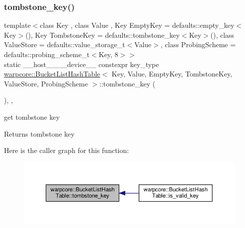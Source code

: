 \subsubsection{\texorpdfstring{tombstone\+\_\+key()}{tombstone\_key()}}
{\footnotesize\ttfamily template$<$class Key , class Value , Key Empty\+Key = defaults\+::empty\+\_\+key$<$\+Key$>$(), Key Tombstone\+Key = defaults\+::tombstone\+\_\+key$<$\+Key$>$(), class Value\+Store  = defaults\+::value\+\_\+storage\+\_\+t$<$\+Value$>$, class Probing\+Scheme  = defaults\+::probing\+\_\+scheme\+\_\+t$<$\+Key, 8$>$$>$ \\
static \+\_\+\+\_\+host\+\_\+\+\_\+\+\_\+\+\_\+device\+\_\+\+\_\+ constexpr key\+\_\+type \hyperlink{classwarpcore_1_1BucketListHashTable}{warpcore\+::\+Bucket\+List\+Hash\+Table}$<$ Key, Value, Empty\+Key, Tombstone\+Key, Value\+Store, Probing\+Scheme $>$\+::tombstone\+\_\+key (\begin{DoxyParamCaption}{ }\end{DoxyParamCaption})\hspace{0.3cm}{\ttfamily [inline]}, {\ttfamily [static]}, {\ttfamily [noexcept]}}



get tombstone key 

\begin{DoxyReturn}{Returns}
tombstone key 
\end{DoxyReturn}
Here is the caller graph for this function\+:
\nopagebreak
\begin{figure}[H]
\begin{center}
\leavevmode
\includegraphics[width=350pt]{classwarpcore_1_1BucketListHashTable_a985f5a5fc540a0a157a7508f8b326a50_icgraph}
\end{center}
\end{figure}
\mbox{\label{classwarpcore_1_1BucketListHashTable_a7777451fb2e8d4016f5baf2a0d22ced0}} 
